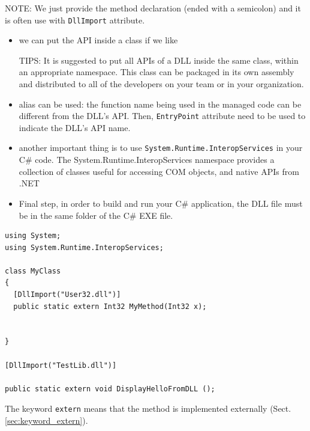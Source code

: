 NOTE: We just provide the method declaration (ended with a semicolon) and it is
often use with \verb!DllImport! attribute.
\begin{itemize}
  \item we can put the API inside a class if we like
  

TIPS: It is suggested to put all APIs of a DLL inside the same class, within an
appropriate namespace. This class can be packaged in its own assembly and
distributed to all of the developers on your team or in your organization.
  
  \item alias can be used: the function name being used in the managed code can
  be different from the DLL's API. Then, \verb!EntryPoint! attribute need to be
  used to indicate the DLL's API name.
  
  
  \item another important thing is to use \verb!System.Runtime.InteropServices! in your
C\# code. The System.Runtime.InteropServices namespace provides a collection of
classes useful for accessing COM objects, and native APIs from .NET
  
  \item Final step, in order to build and run your C\# application, the DLL file must be
in the same folder of the C\# EXE file.
  
\end{itemize}
\begin{verbatim}
using System;
using System.Runtime.InteropServices;

class MyClass
{
  [DllImport("User32.dll")]
  public static extern Int32 MyMethod(Int32 x);
  
  
}

[DllImport("TestLib.dll")]

public static extern void DisplayHelloFromDLL ();

\end{verbatim}
The keyword \verb!extern! means that the method is implemented externally
(Sect.\ref{sec:keyword_extern}).


